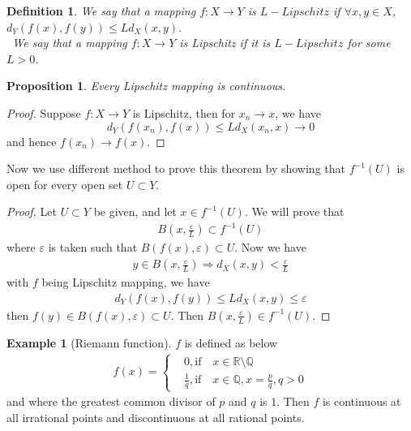 \documentclass[12pt,leqno]{amsart}
\newtheorem{definition}{Definition}[section]
\newtheorem{proposition}{Proposition}[section]
\theoremstyle{definition}
\newtheorem{example}{Example}[section]
\numberwithin{equation}{subsection}
\begin{document}
\medskip

\begin{definition}
We say that a mapping $f:X\to Y$ is $L-Lipschitz$ if $\forall x,y\in X$, $d_Y(f(x),f(y))\leq L d_X(x,y)$. \\
\hspace*{1em}\, We say that a mapping $f:X\to Y$ is Lipschitz if it is $L-Lipschitz$ for some $L>0$.
\end{definition}

\medskip

\begin{proposition}
Every Lipschitz mapping is continuous.
\end{proposition}
\begin{proof}
Suppose $f:X\to Y$ is Lipschitz, then for $x_n\to x$, we have $$d_Y(f(x_n),f(x))\leq L d_X(x_n,x)\to 0$$ 
and hence $f(x_n)\to f(x)$.
\end{proof}
Now we use different method to prove this theorem by showing that $f^{-1}(U)$ is open for every open set $U\subset Y$.
\begin{proof}
Let $U\subset Y$ be given, and let $x\in f^{-1}(U)$. We will prove that 
\begin{align*}
    B\left(x, \frac{\varepsilon}{L}\right)\subset f^{-1}(U)
\end{align*}
where $\varepsilon$ is taken such that $B(f(x),\varepsilon)\subset U$. Now we have
\begin{align*}
    y\in B\left(x, \frac{\varepsilon}{L}\right) \Rightarrow d_X(x,y) < \frac{\varepsilon}{L}
\end{align*}
with $f$ being Lipschitz mapping, we have 
\begin{align*}
    d_Y(f(x),f(y))\leq L d_X(x,y) \leq \varepsilon
\end{align*}
then $f(y)\in B(f(x),\varepsilon)\subset U$. Then $B\left(x, \frac{\varepsilon}{L}\right)\in f^{-1}(U)$.
\end{proof}

\medskip

\begin{example}[Riemann function]
$f$ is defined as below
\begin{align*}
    f(x) = \left\{
    \begin{aligned}
    & 0, \text{if} \quad x \in \mathbb{R}\setminus\mathbb{Q}\\
    & \frac{1}{q}, \text{if} \quad x \in \mathbb{Q}, x = \frac{p}{q}, q > 0
    \end{aligned}
    \right.
\end{align*}
and where the greatest common divisor of $p$ and $q$ is $1$. Then $f$ is continuous at all irrational points and discontinuous at all rational points.
\end{example}
\end{document}
